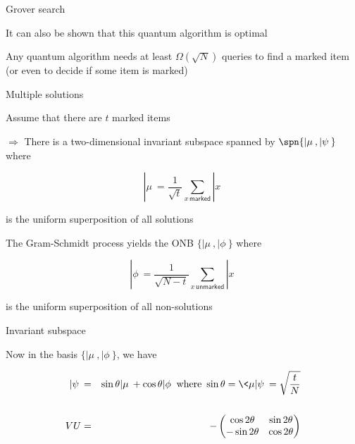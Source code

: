 
\begin{frame}{Grover search}

It can also be shown that this quantum algorithm is optimal

\bigskip
Any quantum algorithm needs at least $\Omega(\sqrt N)$ queries to find a marked item (or even to decide if some item is marked)

\end{frame}


\begin{frame}{Multiple solutions}

Assume that there are $t$ marked items

\bigskip
$\Rightarrow$ There is a two-dimensional invariant subspace spanned by $\spn\{|\mu\>,|\psi\>\}$ where

\[
|\mu\> = \frac{1}{\sqrt{t}} \sum_{x \, \mathsf{marked}} |x\>
\]

is the uniform superposition of all solutions

\bigskip
The Gram-Schmidt process yields the ONB $\{|\mu\>,|\phi\>\}$ where

\[
|\phi\> = \frac{1}{\sqrt{N-t}} \sum_{x \, \mathsf{unmarked}} |x\>
\]

is the uniform superposition of all non-solutions

\end{frame}




\begin{frame}{Invariant subspace}

Now in the basis $\{|\mu\>,|\phi\>\}$, we have

\begin{eqnarray*}  
	|\psi\> & = & \sin\theta |\mu\> + \cos\theta |\phi\> \mbox{ where } \sin\theta = \<\mu|\psi\> = \sqrt{\frac{t}{N}} \\
					&   & \\
  V U & = & - \begin{pmatrix} \cos2\theta   & \sin2\theta \\
                              - \sin2\theta & \cos2\theta
              \end{pmatrix}
\end{eqnarray*}
\end{frame}


